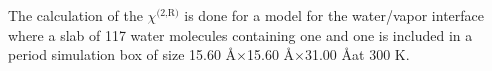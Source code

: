The calculation of the $\chi^\text{(2,R)}$ is done for a model for the water/vapor interface 
where a slab of 117 water molecules containing one \Li and one \nitrate is included 
in a period simulation box of size 15.60 \AA$\times$15.60 \AA$\times$31.00 \AA at 300 K.




